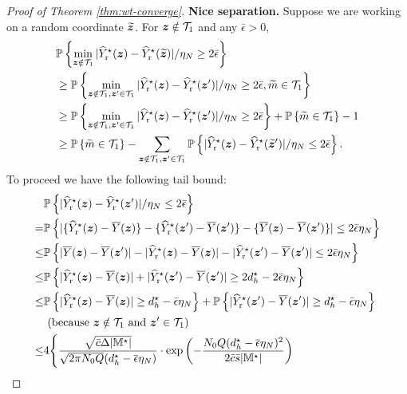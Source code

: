\documentclass[12pt]{article}
\begin{document}
\begin{proof}[Proof of Theorem \ref{thm:wt-converge}]
\textbf{Nice separation.} Suppose we are working on a random coordinate $\widetilde{{\boldsymbol{z}}}$. For ${\boldsymbol{z}}\notin {\mathcal{T}}_{1}$ and any $\bar{\epsilon}>0$, 
\begin{align}
    &{\mathbb{P}}\left\{\min_{{\boldsymbol{z}}\notin {\mathcal{T}}_{1}}|{\widehat{Y}}^\star_{\operatorname{r}}({\boldsymbol{z}}) - {\widehat{Y}}^\star_{\operatorname{r}}(\widetilde{{\boldsymbol{z}}})|/\eta_N \ge 2\bar{\epsilon}\right\} \notag\\
    & \ge {\mathbb{P}}\left\{\min_{{\boldsymbol{z}}\notin {\mathcal{T}}_{1}, {\boldsymbol{z}}'\in {\mathcal{T}}_{1}}|{\widehat{Y}}^\star_{\operatorname{r}}({\boldsymbol{z}}) - {\widehat{Y}}^\star_{\operatorname{r}}({{\boldsymbol{z}}}')|/\eta_N \ge 2\bar{\epsilon}, \widetilde{m}\in {\mathcal{T}}_{1}\right\}\notag\\
    & \ge {\mathbb{P}}\left\{\min_{{\boldsymbol{z}}\notin {\mathcal{T}}_{1}, {\boldsymbol{z}}'\in {\mathcal{T}}_{1}}|{\widehat{Y}}^\star_{\operatorname{r}}({\boldsymbol{z}}) - {\widehat{Y}}^\star_{\operatorname{r}}({{\boldsymbol{z}}}')|/\eta_N \ge 2\bar{\epsilon}\right\} + {\mathbb{P}}\left\{\widetilde{m}\in {\mathcal{T}}_{1}\right\} - 1\notag\\
    & \ge {\mathbb{P}}\left\{\widetilde{m}\in {\mathcal{T}}_{1}\right\} - \sum_{{\boldsymbol{z}}\notin {\mathcal{T}}_{1}, {\boldsymbol{z}}'\in{\mathcal{T}}_{1}}{\mathbb{P}}\left\{|{\widehat{Y}}^\star_{\operatorname{r}}({\boldsymbol{z}}) - {\widehat{Y}}^\star_{\operatorname{r}}(\widetilde{{\boldsymbol{z}}}')|/\eta_N \le 2\bar{\epsilon}\right\}. \label{eqn:separation-1}
\end{align}
To proceed we have the following tail bound:
\begin{align*}
    & \bbP\lt\{|\hY^\star_{\operatorname{r}}(\bz) - \hY^\star_{\operatorname{r}}(\bz')|/\eta_N \le 2\bar{\epsilon}\rt\} \\
    = & \bbP\lt\{|\{\hY^\star_{\operatorname{r}}(\bz)-\overline{Y}(\bz)\} - \{\hY^\star_{\operatorname{r}}(\bz')-\overline{Y}(\bz')\} - \{\overline{Y}(\bz)-\overline{Y}(\bz')\}| \le 2\bar{\epsilon}\eta_N\rt\}\\
    \le &  \bbP\lt\{|\overline{Y}(\bz)-\overline{Y}(\bz')|-|\hY^\star_{\operatorname{r}}(\bz)-\overline{Y}(\bz)| - |\hY^\star_{\operatorname{r}}(\bz')-\overline{Y}(\bz')| \le 2\bar{\epsilon}\eta_N\rt\}\\
    \le & \bbP\lt\{|\hY^\star_{\operatorname{r}}(\bz)-\overline{Y}(\bz)| + |\hY^\star_{\operatorname{r}}(\bz')-\overline{Y}(\bz')|\ge 2d_h^\star - 2\bar{\epsilon}\eta_N \rt\}\\
    \le & \bbP\lt\{|\hY^\star_{\operatorname{r}}(\bz)-\overline{Y}(\bz)|\ge  {d_h^\star - \bar{\epsilon}\eta_N} \rt\} + \bbP\lt\{|\hY^\star_{\operatorname{r}}(\bz')-\overline{Y}(\bz')|\ge {d_h^\star - \bar{\epsilon}\eta_N} \rt\} \\
    & \see{because $\bz\notin\cT_{1}$ and $\bz'\in\cT_{1}$}\\
    \le & 4\Bigg\{ \frac{\sqrt{\bar{c}\Delta|\bbM^\star|}}{\sqrt{2\pi N_0Q }(d_h^\star - \overline{\epsilon}\eta_N)}\cdot \exp\lt(-\frac{ N_0Q (d_h^\star - \overline{\epsilon}\eta_N)^2}{2\bar{c}\bar{s}|\bbM^\star|}\rt) \\

\end{align*}
\end{proof}
\end{document}

